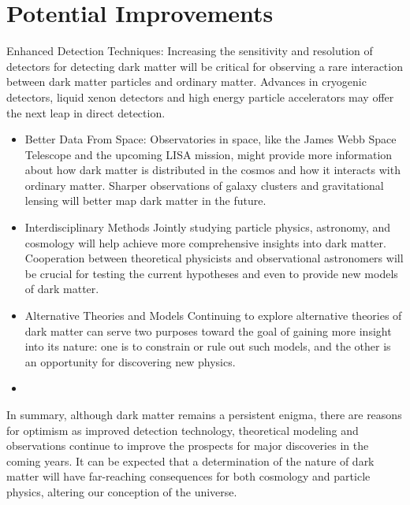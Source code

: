 \section{Potential Improvements}
Enhanced Detection Techniques: Increasing the sensitivity and resolution of detectors for detecting dark matter will be critical for observing a rare interaction between dark matter particles and ordinary matter. Advances in cryogenic detectors, liquid xenon detectors and high energy particle accelerators may offer the next leap in direct detection.

\begin{itemize}
    \item Better Data From Space: Observatories in space, like the James Webb Space Telescope and the upcoming LISA mission, might provide more information about how dark matter is distributed in the cosmos and how it interacts with ordinary matter. Sharper observations of galaxy clusters and gravitational lensing will better map dark matter in the future.

    \item Interdisciplinary Methods Jointly studying particle physics, astronomy, and cosmology will help achieve more comprehensive insights into dark matter. Cooperation between theoretical physicists and observational astronomers will be crucial for testing the current hypotheses and even to provide new models of dark matter.

    \item Alternative Theories and Models Continuing to explore alternative theories of dark matter can serve two purposes toward the goal of gaining more insight into its nature: one is to constrain or rule out such models, and the other is an opportunity for discovering new physics.
    \item 
\end{itemize}
In summary, although dark matter remains a persistent enigma, there are reasons for optimism as improved detection technology, theoretical modeling and observations continue to improve the prospects for major discoveries in the coming years. It can be expected that a determination of the nature of dark matter will have far-reaching consequences for both cosmology and particle physics, altering our conception of the universe.

 